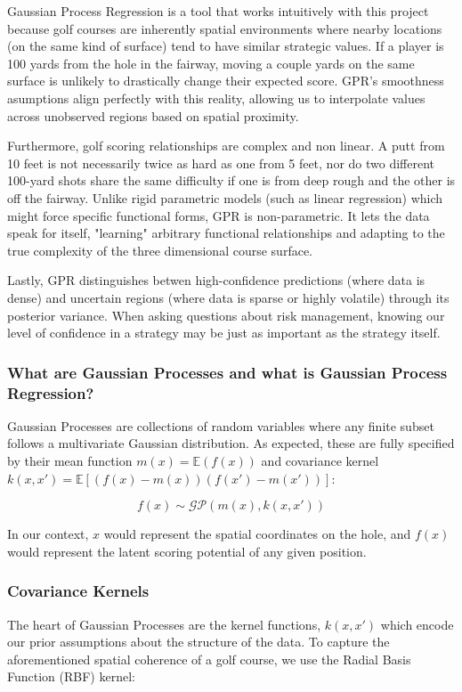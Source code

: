 \documentclass[11pt, letterpaper]{article}
\begin{document}
Gaussian Process Regression is a tool that works intuitively with this project because golf courses are inherently spatial environments where nearby locations (on the same kind of surface) tend to have similar strategic values. If a player is 100 yards from the hole in the fairway, moving a couple yards on the same surface is unlikely to drastically change their expected score. GPR's smoothness asumptions align perfectly with this reality, allowing us to interpolate values across unobserved regions based on spatial proximity.

Furthermore, golf scoring relationships are complex and non linear. A putt from 10 feet is not necessarily twice as hard as one from 5 feet, nor do two different 100-yard shots share the same difficulty if one is from deep rough and the other is off the fairway. Unlike rigid parametric models (such as linear regression) which might force specific functional forms, GPR is non-parametric. It lets the data speak for itself, "learning" arbitrary functional relationships and adapting to the true complexity of the three dimensional course surface.

Lastly, GPR distinguishes betwen high-confidence predictions (where data is dense) and uncertain regions (where data is sparse or highly volatile) through its posterior variance. When asking questions about risk management, knowing our level of confidence in a strategy may be just as important as the strategy itself.

\subsubsection{What are Gaussian Processes and what is Gaussian Process Regression?}

Gaussian Processes are collections of random variables where any finite subset follows a multivariate Gaussian distribution. As expected, these are fully specified by their mean function $m(x) = \mathbb{E}(f(x))$  and covariance kernel $k(x,x') = \mathbb{E}[(f(x)-m(x))(f(x')-m(x'))]$:

$$f(x) \sim \mathcal{GP}(m(x), k(x,x'))$$

In our context, $x$ would represent the spatial coordinates on the hole, and $f(x)$ would represent the latent scoring potential of any given position. 

\subsubsection{Covariance Kernels}
The heart of Gaussian Processes are the kernel functions, $k(x,x')$ which encode our prior assumptions about the structure of the data. To capture the aforementioned spatial coherence of a golf course, we use the Radial Basis Function (RBF) kernel:
\end{document}
